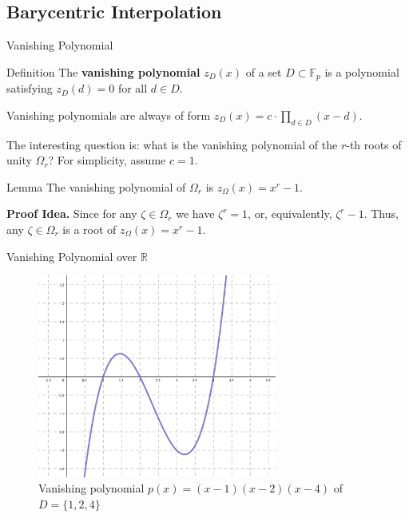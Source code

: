 \documentclass{zkdl-presentation-template}
\begin{document}
    \subsection{Barycentric Interpolation}
    \begin{frame}{Vanishing Polynomial}
        \begin{block}{Definition}
            The \textbf{vanishing polynomial} $z_D(x)$ of a set $D \subset \mathbb{F}_p$
            is a polynomial satisfying $z_D(d) = 0$ for all $d \in D$.
        \end{block}
        Vanishing polynomials are always of form $z_D(x) = c \cdot \prod_{d \in
        D}(x-d)$. 

        The interesting question is: what is the vanishing polynomial of the
        $r$-th roots of unity $\Omega_r$? For simplicity, assume $c=1$.

        \begin{block}{Lemma}
            The vanishing polynomial of $\Omega_r$ is $z_{\Omega}(x) = x^r-1$.
        \end{block}

        \textbf{Proof Idea.} Since for any $\zeta \in \Omega_r$ we have $\zeta^r=1$, or, 
        equivalently, $\zeta^r-1$. Thus, any $\zeta \in \Omega_r$ is a root of $z_{\Omega}(x) = x^r-1$.
    \end{frame}

    \begin{frame}{Vanishing Polynomial over $\mathbb{R}$}
        \begin{figure}
            \centering
            \includegraphics[width=0.7\textwidth]{images/lecture_13/vanishing.png}
            \caption{Vanishing polynomial $p(x)=(x-1)(x-2)(x-4)$ of $D=\{1,2,4\}$}
        \end{figure}
    \end{frame}
\end{document}
